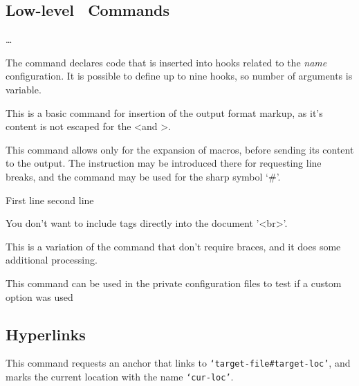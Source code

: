 \subsection{Low-level \texfourht\ Commands}

\ldots{}

The  command declares code that is inserted into hooks related to the \textit{name} configuration.
It is possible to define up to nine hooks, so number of arguments is variable.





This is a basic command for insertion of the output format markup, as it's content is not escaped for the \textless and \textgreater.

This command allows only for the expansion of macros, before sending its content to the output. 
The instruction \texcommand{\Hnewline} may be introduced there for requesting line breaks, and the command \texcommand{\#} may be used for the sharp symbol ‘\#’.

\begin{texsource}
 First line
 second line 

 You don't want to include tags directly into the document '<br>'. 
\end{texsource}


This is a variation of the  command that don't require braces, and it does some additional processing.


This command can be used in the private configuration files to test if a custom option was used

\subsection{Hyperlinks}


This command requests an anchor that links to \verb|‘target-file#target-loc’|, and marks the current location with the name \texttt{‘cur-loc’}.

